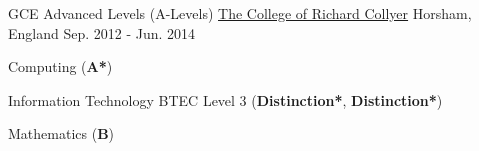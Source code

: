 \begin{cventries}
  \cventry
    {GCE Advanced Levels (A-Levels)} %
    {\href{https://www.collyers.ac.uk/}{The College of Richard Collyer}} %
    {Horsham, England} %
    {Sep. 2012 - Jun. 2014} %
    {
      \begin{cvitems} %
        \item {Computing (\textbf{A*})}
        \item {Information Technology BTEC Level 3 (\textbf{Distinction*}, \textbf{Distinction*})}
        \item {Mathematics (\textbf{B})}
      \end{cvitems}
    }
    {}

\end{cventries}
